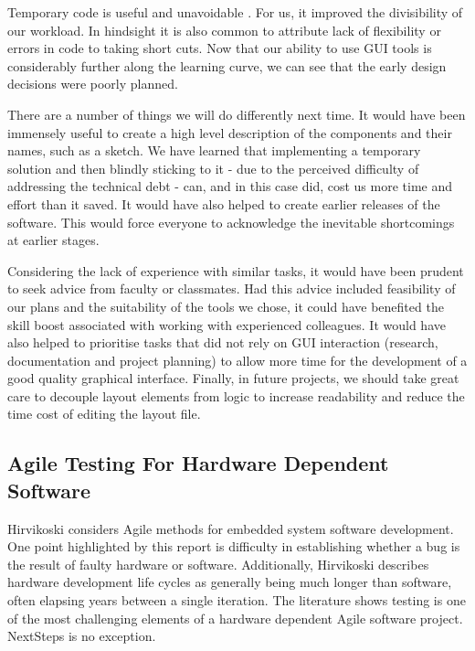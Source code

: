 \documentclass{l3proj}
\begin{document}
Temporary code is useful and unavoidable \cite{halpern}. For us, it improved the divisibility of our workload. In hindsight it is also common to attribute lack of flexibility or errors in code to taking short cuts\cite{stopford}. Now that our ability to use GUI tools is considerably further along the learning curve, we can see that the early design decisions were poorly planned. 

There are a number of things we will do differently next time. It would have been immensely useful to create a high level description of the components and their names, such as a sketch. We have learned that implementing a temporary solution and then blindly sticking to it - due to the perceived difficulty of addressing the technical debt - can, and in this case did, cost us more time and effort than it saved. It would have also helped to create earlier releases of the software. This would force everyone to acknowledge the inevitable shortcomings at earlier stages.

Considering the lack of experience with similar tasks, it would have been prudent to seek advice from faculty or classmates. Had this advice included feasibility of our plans and the suitability of the tools we chose, it could have benefited the skill boost associated with working with experienced colleagues\cite{panwong}. It would have also helped to prioritise tasks that did not rely on GUI interaction (research, documentation and project planning) to allow more time for the development of a good quality graphical interface. Finally, in future projects, we should take great care to decouple layout elements from logic to increase readability and reduce the time cost of editing the layout file.

\subsection{Agile Testing For Hardware Dependent Software}
\label{subsection:agile}
Hirvikoski considers Agile methods for embedded system software development\cite{hirvikoski}. One point highlighted by this report is difficulty in establishing whether a bug is the result of faulty hardware or software. Additionally, Hirvikoski describes hardware development life cycles as generally being much longer than software, often elapsing years between a single iteration. The literature shows testing is one of the most challenging elements of a hardware dependent Agile software project. NextSteps is no exception. 
\end{document}

